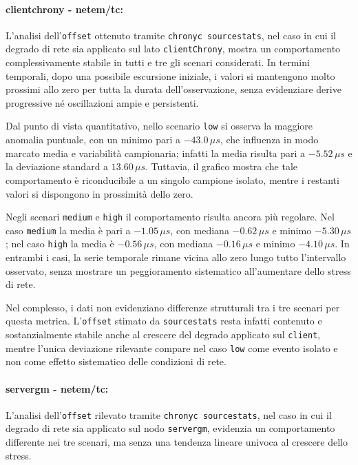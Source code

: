 \paragraph*{clientchrony - netem/tc:}
L’analisi dell’\texttt{offset} ottenuto tramite \texttt{chronyc sourcestats},
nel caso in cui il degrado di rete sia applicato sul lato \texttt{clientChrony},
mostra un comportamento complessivamente stabile in tutti e tre gli scenari
considerati. In termini temporali, dopo una possibile escursione iniziale, i valori
si mantengono molto prossimi allo zero per tutta la durata dell’osservazione,
senza evidenziare derive progressive né oscillazioni ampie e persistenti.

Dal punto di vista quantitativo, nello scenario \texttt{low} si osserva la
maggiore anomalia puntuale, con un minimo pari a $-43.0\,\mu s$, che influenza
in modo marcato media e variabilità campionaria; infatti la media risulta pari a $-
5.52\,\mu s$ e la deviazione standard a $13.60\,\mu s$. Tuttavia, il grafico mostra
che tale comportamento è riconducibile a un singolo campione isolato, mentre i
restanti valori si dispongono in prossimità dello zero.

Negli scenari \texttt{medium} e \texttt{high} il comportamento risulta ancora
più regolare. Nel caso \texttt{medium} la media è pari a $-1.05\,\mu s$, con mediana
$-0.62\,\mu s$ e minimo $-5.30\,\mu s$; nel caso \texttt{high} la media è $-0.56\,
\mu s$, con mediana $-0.16\,\mu s$ e minimo $-4.10\,\mu s$. In entrambi i casi,
la serie temporale rimane vicina allo zero lungo tutto l’intervallo osservato, senza
mostrare un peggioramento sistematico all’aumentare dello stress di rete.

Nel complesso, i dati non evidenziano differenze strutturali tra i tre scenari
per questa metrica. L’\texttt{offset} stimato da \texttt{sourcestats} resta
infatti contenuto e sostanzialmente stabile anche al crescere del degrado
applicato sul \texttt{client}, mentre l’unica deviazione rilevante compare nel
caso \texttt{low} come evento isolato e non come effetto sistematico delle condizioni
di rete.

\paragraph*{servergm - netem/tc:}
L’analisi dell’\texttt{offset} rilevato tramite \texttt{chronyc sourcestats},
nel caso in cui il degrado di rete sia applicato sul nodo \texttt{servergm},
evidenzia un comportamento differente nei tre scenari, ma senza una tendenza lineare
univoca al crescere dello stress.

